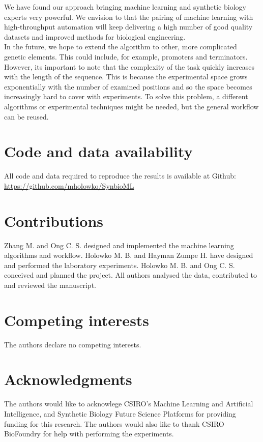 \documentclass{article}
\begin{document}
We have found our approach bringing machine learning and synthetic biology experts very powerful.
We envision to that the pairing of machine learning with high-throughput automation will keep delivering a high number of good quality datasets nad improved methods for biological engineering.\\

In the future, we hope to extend the algorithm to other, more complicated genetic elements.
This could include, for example, promoters and terminators.
However, its important to note that the complexity of the task quickly increases with the length of the sequence.
This is because the experimental space grows exponentially with the number of examined positions and so the space becomes increasingly hard to cover with experiments.
To solve this problem, a different algorithms or experimental techniques might be needed, but the general workflow can be reused.\\



\section*{Code and data availability}

All code and data required to reproduce the results is available at Github: \url{https://github.com/mholowko/SynbioML}

\section*{Contributions}
Zhang M. and Ong C. S. designed and implemented the machine learning algorithms and workflow. Holowko M. B. and Hayman Zumpe H. have designed and performed the laboratory experiments. Holowko M. B. and Ong C. S. conceived and planned the project. All authors analysed the data, contributed to and reviewed the manuscript.

\section*{Competing interests}
The authors declare no competing interests.

\section*{Acknowledgments}
The authors would like to acknowlege CSIRO's Machine Learning and Artificial Intelligence, and Synthetic Biology Future Science Platforms for providing funding for this research. The authors would also like to thank CSIRO BioFoundry for help with performing the experiments.


\newpage

\printbibliography

\clearpage

\appendix

\end{document}
